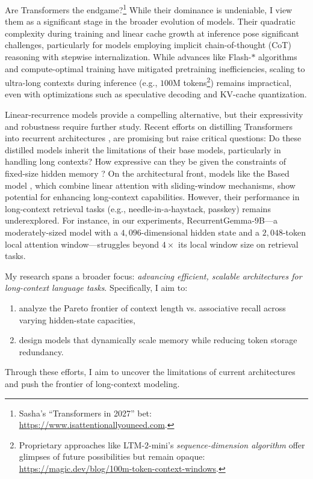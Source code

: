 Are Transformers the endgame?\footnote{Sasha's ``Transformers in 2027'' bet: \url{https://www.isattentionallyouneed.com}.}
%
While their dominance is undeniable, I view them as a significant stage in the broader evolution of models.
% 
Their quadratic complexity during training and linear cache growth at inference pose significant challenges, particularly for models employing implicit chain-of-thought (CoT) reasoning with stepwise internalization.
% 
While advances like Flash-$\ast$ algorithms \citep{fu_flashfftconv_2023,shah_flashattention-3_2024} and compute-optimal training \citep{muennighoff_scaling_2023} have mitigated pretraining inefficiencies, scaling to ultra-long contexts during inference (e.g., $100$M tokens\footnote{Proprietary approaches like LTM-$2$-mini's \textit{sequence-dimension algorithm} offer glimpses of future possibilities but remain opaque: \url{https://magic.dev/blog/100m-token-context-windows}.}) remains impractical, even with optimizations such as speculative decoding and KV-cache quantization.

Linear-recurrence models provide a compelling alternative, but their expressivity and robustness require further study.
% 
Recent efforts on distilling Transformers into recurrent architectures \citep{zhang_hedgehog_2024,wang_mamba_2024,zhang_lolcats_2024,bick_transformers_2024}, are promising but raise critical questions:
%
Do these distilled models inherit the limitations of their base models, particularly in handling long contexts?
% 
How expressive can they be given the constraints of fixed-size hidden memory \citep{jelassi_repeat_2024}?
% 
On the architectural front, models like the Based model \citep{arora_simple_2024}, which combine linear attention with sliding-window mechanisms, show potential for enhancing long-context capabilities.
% 
However, their performance in long-context retrieval tasks (e.g., needle-in-a-haystack, passkey) remains underexplored.
% 
For instance, in our experiments, RecurrentGemma-$9$B---a moderately-sized model with a $4,096$-dimensional hidden state and a $2,048$-token local attention window---struggles beyond $4\times$ its local window size on retrieval tasks.

My research spans a broader focus: \textit{advancing efficient, scalable architectures for long-context language tasks}.
% 
Specifically, I aim to:
\begin{enumerate}[itemsep=-2pt, topsep=-1pt] 
    \item analyze the Pareto frontier of context length vs. associative recall across varying hidden-state capacities,
    \item design models that dynamically scale memory while reducing token storage redundancy.
\end{enumerate}

Through these efforts, I aim to uncover the limitations of current architectures and push the frontier of long-context modeling.
